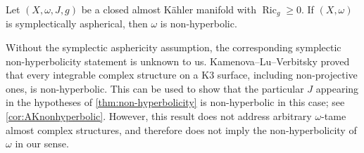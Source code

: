 \documentclass[11pt,twoside]{amsart}
\DeclareMathOperator{\Ric}{Ric}
\begin{document}









\begin{corollary}\label{thm:non-hyperbolicity}
Let $(X,\omega,J,g)$ be a closed almost K\"ahler manifold with
\(
    \Ric_g\geq 0.
\)
 If $(X,\omega)$ is symplectically aspherical, then $\omega$ is non-hyperbolic.
\end{corollary}

\begin{remark}
Without the symplectic asphericity assumption, the corresponding symplectic non-hyperbolicity statement is unknown to us. Kamenova--Lu--Verbitsky \cite{KLV14} proved that every integrable complex structure on a K3 surface, including non-projective ones, is non-hyperbolic. This can be used to show that the particular $J$ appearing in the hypotheses of \autoref{thm:non-hyperbolicity} is non-hyperbolic in this case; see \autoref{cor:AKnonhyperbolic}. However, this result does not address arbitrary $\omega$-tame almost complex structures, and therefore does not imply the non-hyperbolicity of $\omega$ in our sense.
\end{remark}
\end{document}
